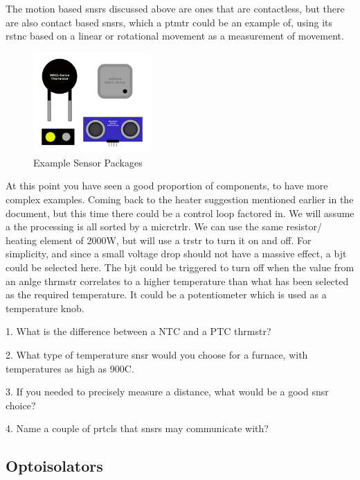 \documentclass[a4paper,11pt]{report}
\newcommand{\Examples}[1] %
{
\par\noindent %
\phantomsection %
\todo[inline, color=red!30]{\textbf{#1}} %
\vspace{1em} %
}
\newcommand{\Quiz}[1] %
{
\par\noindent %
\phantomsection %
\todo[inline, color=blue!30]{\textbf{#1}} %
\vspace{1em} %
}
\begin{document}
The motion based \gls{snsr}s discussed above are ones that are contactless, but there are also contact based \gls{snsr}s, which a \gls{ptmtr} could be an example of, using its \gls{rstnc} based on a linear or rotational movement as a measurement of movement.

\begin{figure}[H]
\centering
\includegraphics[width=0.4\textwidth]{SensorPackages}
\caption{Example Sensor Packages}
\end{figure}

\Examples{Examples}

At this point you have seen a good proportion of components, to have more complex examples. Coming back to the heater suggestion mentioned earlier in the document, but this time there could be a control loop factored in. We will assume a the processing is all sorted by a \gls{micrctrlr}. We can use the same resistor/ heating element of 2000W, but will use a \gls{trstr} to turn it on and off. For simplicity, and since a small voltage drop should not have a massive effect, a \gls{bjt} could be selected here. The \gls{bjt} could be triggered to turn off when the value from an \gls{anlge} \gls{thrmstr} correlates to a higher temperature than what has been selected as the required temperature. It could be a potentiometer which is used as a temperature knob.

\Quiz{Quiz}

1. What is the difference between a NTC and a PTC \gls{thrmstr}?

2. What type of temperature \gls{snsr} would you choose for a furnace, with temperatures as high as 900\degree C.

3. If you needed to precisely measure a distance, what would be a good \gls{snsr} choice?

4. Name a couple of \gls{prtcl}s that \gls{snsr}s may communicate with?

\vspace*{1\baselineskip}

\subsection{Optoisolators}
\end{document}
